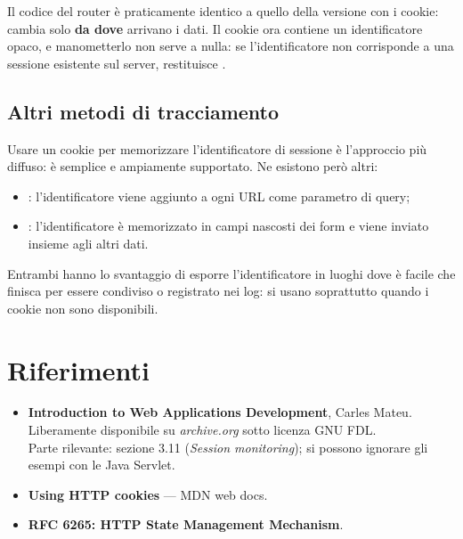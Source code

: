Il codice del router è praticamente identico a quello della versione con i
cookie: cambia solo \textbf{da dove} arrivano i dati. Il cookie ora contiene un
identificatore opaco, e manometterlo non serve a nulla: se l'identificatore non
corrisponde a una sessione esistente sul server, 
restituisce .


\subsection{Altri metodi di tracciamento}

Usare un cookie per memorizzare l'identificatore di sessione è l'approccio più
diffuso: è semplice e ampiamente supportato. Ne esistono però altri:

\begin{itemize}
  \item {}: l'identificatore viene aggiunto a ogni URL come
        parametro di query;
  \item {}: l'identificatore è memorizzato in campi
        nascosti dei form e viene inviato insieme agli altri dati.
\end{itemize}

Entrambi hanno lo svantaggio di esporre l'identificatore in luoghi dove
è facile che finisca per essere condiviso o registrato nei log: si usano
soprattutto quando i cookie non sono disponibili.

\section{Riferimenti}

\begin{itemize}
  \item \textbf{Introduction to Web Applications Development}, Carles Mateu.
        Liberamente disponibile su \textit{archive.org} sotto licenza GNU FDL. \\
        Parte rilevante: sezione 3.11 (\textit{Session monitoring}); si possono
        ignorare gli esempi con le Java Servlet.
  \item \textbf{Using HTTP cookies} --- MDN web docs. \\
  \item \textbf{RFC 6265: HTTP State Management Mechanism}. \\
\end{itemize}
